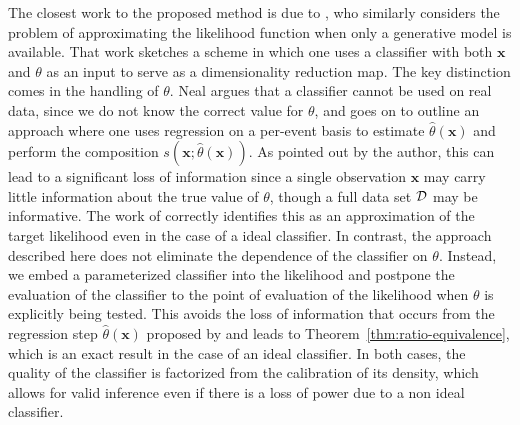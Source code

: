 \documentclass[12pt]{article}
\numberwithin{equation}{section}
\theoremstyle{plain}
\newcommand{\glnote}[1]{\textcolor{red}{[GL: #1]}}
\begin{document}
The closest work to the proposed method is due to \cite{Neal:2007zz}, who
similarly considers the problem of approximating the likelihood function when
only a generative model is available. That work sketches a scheme in which one
uses a classifier with both $\mathbf{x}$ and $\theta$ as an input to serve as a
dimensionality reduction map. The key distinction comes in the handling of
$\theta$.  Neal argues that a classifier cannot be used on real data, since we
do not know the correct value for $\theta$, and goes on to outline an approach
where one uses regression on a per-event basis to estimate
$\hat{\theta}(\mathbf{x})$ and perform the composition $s(\mathbf{x};
\hat{\theta}(\mathbf{x}))$. As pointed out by the author, this can lead to a
significant loss of information since a single observation $\mathbf{x}$ may
carry little information about the true value of $\theta$, though a full data
set ${\cal D}$ may be informative.
The work of \cite{Neal:2007zz} correctly identifies this as
an approximation of the target likelihood even in the case of a ideal
classifier. In contrast, the approach described here does not eliminate the
dependence of the classifier on $\theta$.
Instead, we embed a parameterized classifier
into the likelihood and postpone the evaluation of the classifier to the point
of evaluation of the likelihood when $\theta$ is explicitly being tested. This
avoids the loss of information that occurs from the regression step
$\hat{\theta}(\mathbf{x})$ proposed by \cite{Neal:2007zz} and leads to
Theorem~\ref{thm:ratio-equivalence}, which is an exact result in the case of an
ideal classifier. In both cases, the quality of the classifier is factorized
from the calibration of its density, which allows for valid inference even if
there is a loss of power due to a non ideal classifier.
\end{document}
